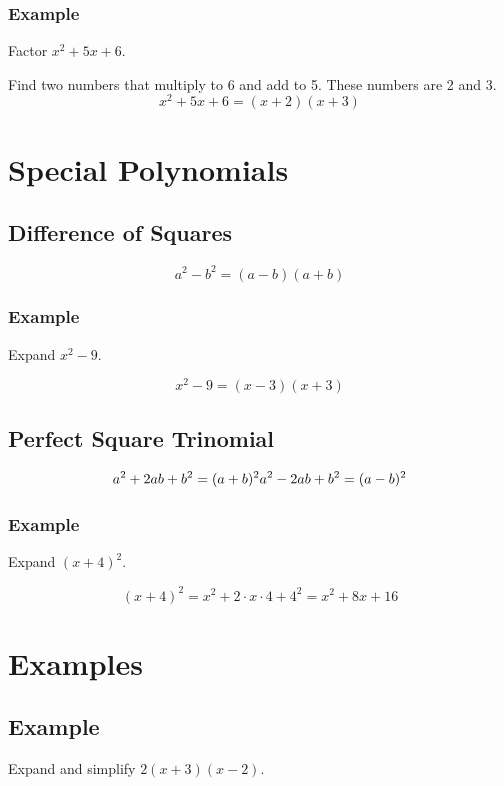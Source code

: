 \documentclass[12pt]{article}
\begin{document}
\subsubsection*{Example}
Factor \( x^2 + 5x + 6 \).

Find two numbers that multiply to 6 and add to 5. These numbers are 2 and 3.
\[
x^2 + 5x + 6 = (x + 2)(x + 3)
\]

\vfill

\newpage

\section*{Special Polynomials}

\vfill

\subsection*{Difference of Squares}
\[
a^2 - b^2 = (a - b)(a + b)
\]
\subsubsection*{Example}
Expand \( x^2 - 9 \).

\[
x^2 - 9 = (x - 3)(x + 3)
\]

\vfill

\subsection*{Perfect Square Trinomial}
\[
a^2 + 2ab + b^2 = (a + b)^2 \\
a^2 - 2ab + b^2 = (a - b)^2
\]
\subsubsection*{Example}
Expand \( (x + 4)^2 \).

\[
(x + 4)^2 = x^2 + 2 \cdot x \cdot 4 + 4^2 = x^2 + 8x + 16
\]

\vfill

\newpage

\section*{Examples}

\vfill

\subsection*{Example}
Expand and simplify \( 2(x + 3)(x - 2) \).
\end{document}
